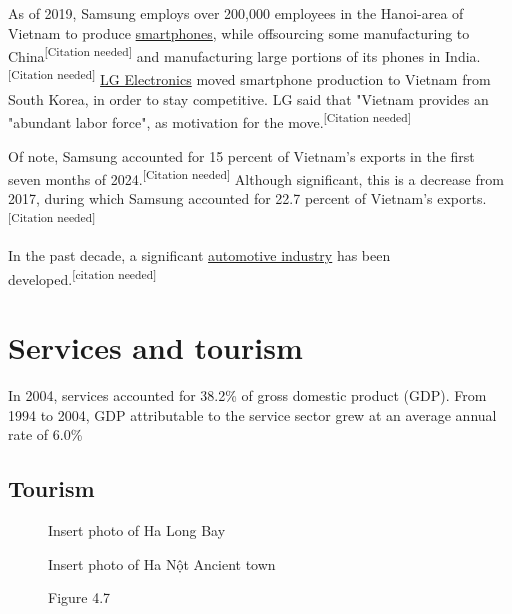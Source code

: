 \documentclass[openany]{book}
\begin{document}
As of 2019, Samsung employs over 200,000 employees in the Hanoi-area of Vietnam to produce \href{https://en.wikipedia.org/wiki/Smartphones}{smartphones}, while offsourcing some manufacturing to China\textsuperscript{[Citation needed]} and manufacturing large portions of its phones in Ind\-ia.\textsuperscript{[Citation needed]} \href{https://en.wikipedia.org/wiki/LG_Electronics}{LG Electronics} moved smartphone production to Vietnam from South Korea, in order to stay competitive. LG said that "Vietnam provides an "abundant labor force", as motivation for the move.\textsuperscript{[Citation needed]}

Of note, Samsung accounted for 15 percent of Vietnam's exports in the first seven months of 2024.\textsuperscript{[Citation needed]} Although significant, this is a decrease from 2017, during which Samsung accounted for 22.7 percent of Vietnam's exports.\textsuperscript{[Citation needed]}

In the past decade, a significant \href{https://en.wikipedia.org/wiki/Automotive_industry_in_Vietnam}{automotive industry} has been \\developed.\textsuperscript{[citation needed]}

\section{Services and tourism}
In 2004, services accounted for 38.2\% of gross domestic product (GDP). From 1994 to 2004, GDP attributable to the service sector grew at an average annual rate of 6.0\%
\subsection{Tourism}


\begin{figure}
    
    \begin{framed}
    \begin{minipage}[t]{0.5\textwidth}
        Insert photo of Ha Long Bay
        \caption*{Hạ Long Bay was recognised as a World Heritage Site in 1994.}
        \caption*{Figure 4.6}
    \end{minipage}
    \hspace{5pt}
    \begin{minipage}[t]{0.45\textwidth}
        Insert photo of Ha Nột Ancient town
        \caption*{\href{https://en.wikipedia.org/wiki/Hoi_An}{Hội An Ancient Town}}
        \caption*{Figure 4.7}
    \end{minipage}
\end{framed}
\end{figure}
\end{document}
